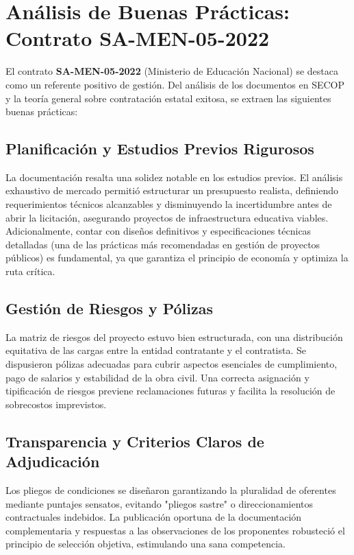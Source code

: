 \documentclass[9pt,a4paper,oneside]{rho-class/rho}
\begin{document}
\section{Análisis de Buenas Prácticas: Contrato SA-MEN-05-2022}

    El contrato \textbf{SA-MEN-05-2022} (Ministerio de Educación Nacional) se destaca como un referente positivo de gestión. Del análisis de los documentos en SECOP y la teoría general sobre contratación estatal exitosa, se extraen las siguientes buenas prácticas:

    \subsection{Planificación y Estudios Previos Rigurosos}
    La documentación resalta una solidez notable en los estudios previos. El análisis exhaustivo de mercado permitió estructurar un presupuesto realista, definiendo requerimientos técnicos alcanzables y disminuyendo la incertidumbre antes de abrir la licitación, asegurando proyectos de infraestructura educativa viables. Adicionalmente, contar con diseños definitivos y especificaciones técnicas detalladas (una de las prácticas más recomendadas en gestión de proyectos públicos) es fundamental, ya que garantiza el principio de economía y optimiza la ruta crítica.

    \subsection{Gestión de Riesgos y Pólizas}
    La matriz de riesgos del proyecto estuvo bien estructurada, con una distribución equitativa de las cargas entre la entidad contratante y el contratista. Se dispusieron pólizas adecuadas para cubrir aspectos esenciales de cumplimiento, pago de salarios y estabilidad de la obra civil. Una correcta asignación y tipificación de riesgos previene reclamaciones futuras y facilita la resolución de sobrecostos imprevistos.

    \subsection{Transparencia y Criterios Claros de Adjudicación}
    Los pliegos de condiciones se diseñaron garantizando la pluralidad de oferentes mediante puntajes sensatos, evitando "pliegos sastre" o direccionamientos contractuales indebidos. La publicación oportuna de la documentación complementaria y respuestas a las observaciones de los proponentes robusteció el principio de selección objetiva, estimulando una sana competencia.
\end{document}
